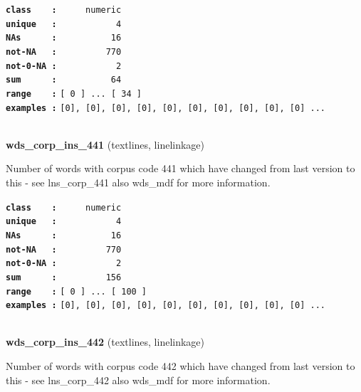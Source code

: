 \documentclass[]{article}
\begin{document}
\textbf{\texttt{class\ \ \ \ :}} \texttt{~~~~~numeric}\\
\textbf{\texttt{unique\ \ \ :}} \texttt{~~~~~~~~~~~4}\\
\textbf{\texttt{NAs\ \ \ \ \ \ :}} \texttt{~~~~~~~~~~16}\\
\textbf{\texttt{not-NA\ \ \ :}} \texttt{~~~~~~~~~770}\\
\textbf{\texttt{not-0-NA\ :}} \texttt{~~~~~~~~~~~2}\\
\textbf{\texttt{sum\ \ \ \ \ \ :}} \texttt{~~~~~~~~~~64}\\
\textbf{\texttt{range\ \ \ \ :}}
\texttt{{[}\ 0\ {]}\ ...\ {[}\ 34\ {]}}\\
\textbf{\texttt{examples\ :}}
\texttt{{[}0{]},\ {[}0{]},\ {[}0{]},\ {[}0{]},\ {[}0{]},\ {[}0{]},\ {[}0{]},\ {[}0{]},\ {[}0{]},\ {[}0{]}\ ...}\\

~

\textbf{wds\_corp\_ins\_441} (textlines, linelinkage)

Number of words with corpus code 441 which have changed from last
version to this - see lns\_corp\_441 also wds\_mdf for more information.

\textbf{\texttt{class\ \ \ \ :}} \texttt{~~~~~numeric}\\
\textbf{\texttt{unique\ \ \ :}} \texttt{~~~~~~~~~~~4}\\
\textbf{\texttt{NAs\ \ \ \ \ \ :}} \texttt{~~~~~~~~~~16}\\
\textbf{\texttt{not-NA\ \ \ :}} \texttt{~~~~~~~~~770}\\
\textbf{\texttt{not-0-NA\ :}} \texttt{~~~~~~~~~~~2}\\
\textbf{\texttt{sum\ \ \ \ \ \ :}} \texttt{~~~~~~~~~156}\\
\textbf{\texttt{range\ \ \ \ :}}
\texttt{{[}\ 0\ {]}\ ...\ {[}\ 100\ {]}}\\
\textbf{\texttt{examples\ :}}
\texttt{{[}0{]},\ {[}0{]},\ {[}0{]},\ {[}0{]},\ {[}0{]},\ {[}0{]},\ {[}0{]},\ {[}0{]},\ {[}0{]},\ {[}0{]}\ ...}\\

~

\textbf{wds\_corp\_ins\_442} (textlines, linelinkage)

Number of words with corpus code 442 which have changed from last
version to this - see lns\_corp\_442 also wds\_mdf for more information.
\end{document}
